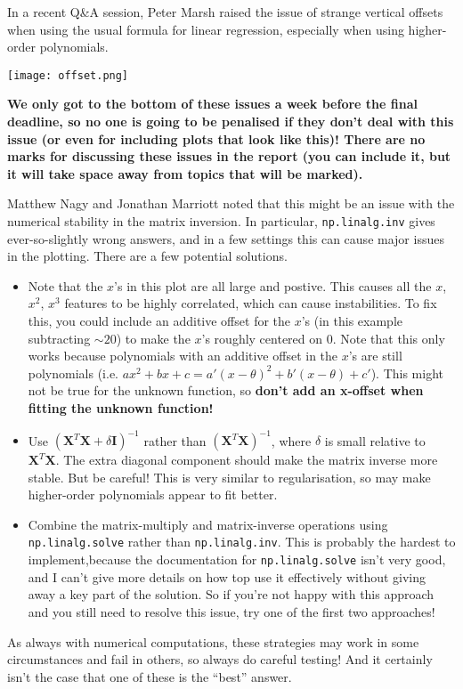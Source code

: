 \documentclass[10pt]{article}
\begin{document}
In a recent Q\&A session, Peter Marsh raised the issue of strange vertical offsets when using the usual formula for linear regression, especially when using higher-order polynomials.

\texttt{[image: offset.png]}

\textbf{We only got to the bottom of these issues a week before the final deadline, so no one is going to be penalised if they don't deal with this issue (or even for including plots that look like this)! There are no marks for discussing these issues in the report (you can include it, but it will take space away from topics that will be marked).}

Matthew Nagy and Jonathan Marriott noted that this might be an issue with the numerical stability in the matrix inversion.
In particular, \texttt{np.linalg.inv} gives ever-so-slightly wrong answers, and in a few settings this can cause major issues in the plotting.
There are a few potential solutions.
\begin{itemize}
  \item Note that the $x$'s in this plot are all large and postive.  This causes all the $x$, $x^2$, $x^3$ features to be highly correlated, which can cause instabilities. To fix this, you could include an additive offset for the $x$'s (in this example subtracting $\sim 20$) to make the $x$'s roughly centered on $0$.  Note that this only works because polynomials with an additive offset in the $x$'s are still polynomials (i.e. $a x^2 + b x + c = a' (x-\theta)^2 + b' (x-\theta) + c'$).  This might not be true for the unknown function, so \textbf{don't add an x-offset when fitting the unknown function!}
  \item Use $(\mathbf{X}^T \mathbf{X} + \delta \mathbf{I})^{-1}$ rather than $(\mathbf{X}^T \mathbf{X})^{-1}$, where $\delta$ is small relative to $\mathbf{X}^T \mathbf{X}$.  The extra diagonal component should make the matrix inverse more stable.  But be careful!  This is very similar to regularisation, so may make higher-order polynomials appear to fit better.
  \item Combine the matrix-multiply and matrix-inverse operations using \texttt{np.linalg.solve} rather than \texttt{np.linalg.inv}.  This is probably the hardest to implement,because the documentation for \texttt{np.linalg.solve} isn't very good, and I can't give more details on how top use it effectively without giving away a key part of the solution.  So if you're not happy with this approach and you still need to resolve this issue, try one of the first two approaches!
\end{itemize}
As always with numerical computations, these strategies may work in some circumstances and fail in others, so always do careful testing!
And it certainly isn't the case that one of these is the ``best'' answer.
\end{document}

